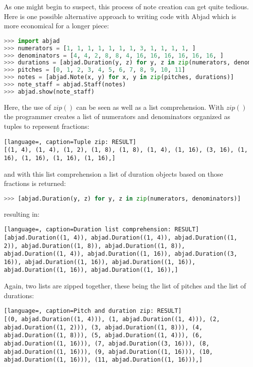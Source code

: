 As one might begin to suspect, this process of note creation can get quite tedious. Here is one possible alternative approach to writing code with Abjad which is more economical for a longer piece:

\singlespace
\begin{lstlisting}[language=Python, caption=Faster note creation]
>>> import abjad
>>> numerators = [1, 1, 1, 1, 1, 1, 1, 3, 1, 1, 1, 1, ]
>>> denominators = [4, 4, 2, 8, 8, 4, 16, 16, 16, 16, 16, 16, ]
>>> durations = [abjad.Duration(y, z) for y, z in zip(numerators, denominators)]
>>> pitches = [0, 1, 2, 3, 4, 5, 6, 7, 8, 9, 10, 11]
>>> notes = [abjad.Note(x, y) for x, y in zip(pitches, durations)]
>>> note_staff = abjad.Staff(notes)
>>> abjad.show(note_staff)
\end{lstlisting}
\doublespace

Here, the use of $zip()$ can be seen as well as a list comprehension. With $zip()$ the programmer creates a list of numerators and denominators organized as tuples to represent fractions:

\singlespace
\begin{lstlisting}[language=, caption=Tuple zip: RESULT]
[(1, 4), (1, 4), (1, 2), (1, 8), (1, 8), (1, 4), (1, 16), (3, 16), (1, 16), (1, 16), (1, 16), (1, 16),]
\end{lstlisting}
\doublespace

and with this list comprehension a list of duration objects based on those fractions is returned:

\singlespace
\begin{lstlisting}[language=Python, caption=Duration list comprehension]
>>> [abjad.Duration(y, z) for y, z in zip(numerators, denominators)]
\end{lstlisting}
\doublespace

resulting in:	

\singlespace
\begin{lstlisting}[language=, caption=Duration list comprehension: RESULT]
[abjad.Duration((1, 4)), abjad.Duration((1, 4)), abjad.Duration((1, 2)), abjad.Duration((1, 8)), abjad.Duration((1, 8)), abjad.Duration((1, 4)), abjad.Duration((1, 16)), abjad.Duration((3, 16)), abjad.Duration((1, 16)), abjad.Duration((1, 16)), abjad.Duration((1, 16)), abjad.Duration((1, 16)),]
\end{lstlisting}
\doublespace

Again, two lists are zipped together, these being the list of pitches and the list of durations:

\singlespace
\begin{lstlisting}[language=, caption=Pitch and duration zip: RESULT]
[(0, abjad.Duration((1, 4))), (1, abjad.Duration((1, 4))), (2, abjad.Duration((1, 2))), (3, abjad.Duration((1, 8))), (4, abjad.Duration((1, 8))), (5, abjad.Duration((1, 4))), (6, abjad.Duration((1, 16))), (7, abjad.Duration((3, 16))), (8, abjad.Duration((1, 16))), (9, abjad.Duration((1, 16))), (10, abjad.Duration((1, 16))), (11, abjad.Duration((1, 16))),]
\end{lstlisting}
\doublespace

